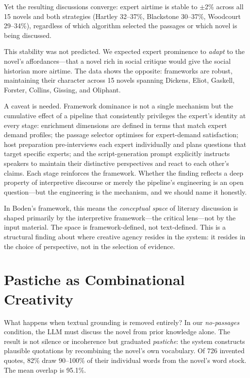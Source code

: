 \documentclass[letterpaper]{article}
\begin{document}
Yet the resulting discussions converge: expert airtime is
stable to $\pm$2\% across all 15 novels and both strategies (Hartley
32--37\%, Blackstone 30--37\%, Woodcourt 29--34\%), regardless of which
algorithm selected the passages or which novel is being discussed.

This stability was not predicted.  We expected expert prominence to
\emph{adapt} to the novel's affordances---that a novel rich in social
critique would give the social historian more airtime.  The data shows
the opposite: frameworks are robust, maintaining their character across
15 novels spanning Dickens, Eliot, Gaskell, Forster, Collins, Gissing,
and Oliphant.

A caveat is needed.  Framework dominance is not a single mechanism but
the cumulative effect of a pipeline that consistently privileges the
expert's identity at every stage: enrichment dimensions are defined
in terms that match expert demand profiles; the passage selector
optimises for expert-demand satisfaction; host preparation
pre-interviews each expert individually and plans questions that
target specific experts; and the script-generation prompt explicitly
instructs speakers to maintain their distinctive perspectives and
react to each other's claims.  Each stage reinforces the framework.
Whether the finding reflects a deep property of interpretive discourse
or merely the pipeline's engineering is an open question---but the
engineering is the mechanism, and we should name it honestly.

In Boden's framework, this means the \emph{conceptual space} of
literary discussion is shaped primarily by the interpretive
framework---the critical lens---not by the input material.  The space
is framework-defined, not text-defined.  This is a structural finding
about where creative agency resides in the system: it resides in the
choice of perspective, not in the selection of evidence.

\section{Pastiche as Combinational Creativity}

What happens when textual grounding is removed entirely?  In our
\emph{no-passages} condition, the LLM must discuss the novel from
prior knowledge alone.  The result is not silence or incoherence but
graduated \emph{pastiche}: the system constructs plausible quotations
by recombining the novel's own vocabulary.  Of 726 invented quotes,
82\% draw 90--100\% of their individual words from the novel's word
stock.  The mean overlap is 95.1\%.
\end{document}
